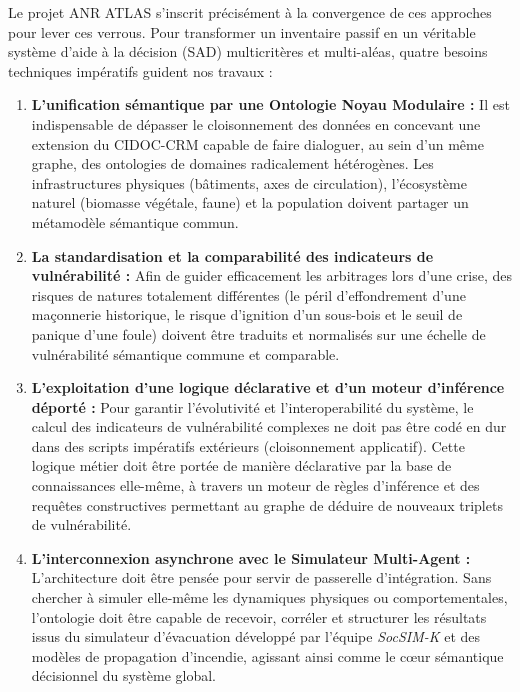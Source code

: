 \documentclass{article}
\begin{document}
Le projet ANR ATLAS s'inscrit précisément à la convergence de ces approches pour lever ces verrous. Pour transformer un inventaire passif en un véritable système d'aide à la décision (SAD) multicritères et multi-aléas, quatre besoins techniques impératifs guident nos travaux :

\begin{enumerate}
    \item \textbf{L'unification sémantique par une Ontologie Noyau Modulaire :} Il est indispensable de dépasser le cloisonnement des données en concevant une extension du CIDOC-CRM capable de faire dialoguer, au sein d'un même graphe, des ontologies de domaines radicalement hétérogènes. Les infrastructures physiques (bâtiments, axes de circulation), l'écosystème naturel (biomasse végétale, faune) et la population doivent partager un métamodèle sémantique commun.
    \item \textbf{La standardisation et la comparabilité des indicateurs de vulnérabilité :} Afin de guider efficacement les arbitrages lors d'une crise, des risques de natures totalement différentes (le péril d'effondrement d'une maçonnerie historique, le risque d'ignition d'un sous-bois et le seuil de panique d'une foule) doivent être traduits et normalisés sur une échelle de vulnérabilité sémantique commune et comparable.
    \item \textbf{L'exploitation d'une logique déclarative et d'un moteur d'inférence déporté :} Pour garantir l'évolutivité et l'interoperabilité du système, le calcul des indicateurs de vulnérabilité complexes ne doit pas être codé en dur dans des scripts impératifs extérieurs (cloisonnement applicatif). Cette logique métier doit être portée de manière déclarative par la base de connaissances elle-même, à travers un moteur de règles d'inférence et des requêtes constructives permettant au graphe de déduire de nouveaux triplets de vulnérabilité.
    \item \textbf{L'interconnexion asynchrone avec le Simulateur Multi-Agent :} L'architecture doit être pensée pour servir de passerelle d'intégration. Sans chercher à simuler elle-même les dynamiques physiques ou comportementales, l'ontologie doit être capable de recevoir, corréler et structurer les résultats issus du simulateur d'évacuation développé par l'équipe \textit{SocSIM-K} et des modèles de propagation d'incendie, agissant ainsi comme le cœur sémantique décisionnel du système global.
\end{enumerate}
\end{document}
